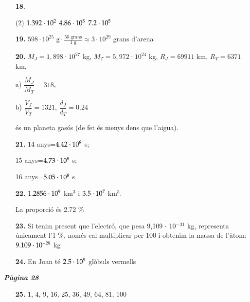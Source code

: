 \documentclass[a4paper, pdf, twoside]{book}
\begin{document}
\begin{multicols}{2}
\begin{enumerate}
 \item[\fontfamily{phv}\selectfont\color{blue}\textbf{18}. ] 
 \begin{tasks}[column-sep=1em, item-indent=1.3333em](2)
	 \task $1.392 \cdot 10^{2}$
	 \task $4.86 \cdot 10^{5}$
	 \task $7.2 \cdot 10^{5}$
\end{tasks}
\vspace{0.25cm}
\item[\fontfamily{phv}\selectfont\color{blue}\textbf{19. }]  \scalebox{0.6}{\simbolclau } 
$ 598 \cdot 10^{25} \text { g} \cdot \frac {50 \text { grans}}{1 \text { g}} \approx 3\cdot 10^{29}$ grans d'arena
\vspace{0.25cm}
\item[\fontfamily{phv}\selectfont\color{blue}\textbf{20. }] 
$M_J=1,898$·$10^{27}$ kg, $M_T=5,972$·$10^{24}$ kg, $R_J=69911$ km, $R_T=6371$ km, \par a) $\dfrac {M_J}{M_T} = 318$,\par b) $\dfrac {V_J}{V_T} = 1321$, $\dfrac {d_J}{d_T} = 0.24$\par és un planeta gasós (de fet és menys dens que l'aigua).
\vspace{0.25cm}
\item[\fontfamily{phv}\selectfont\color{blue}\textbf{21. }] 
14 anys=$4.42 \cdot 10^{8}$ s;\par 15 anys=$4.73 \cdot 10^{8}$ s;\par 16 anys=$5.05 \cdot 10^{8}$ s
\vspace{0.25cm}
\item[\fontfamily{phv}\selectfont\color{blue}\textbf{22. }] 
$1.2856 \cdot 10^{9}$ km${}^{3}$ i $3.5 \cdot 10^{7}$ km${}^{3}$.\par La proporció és 2.72 \%
\vspace{0.25cm}
\item[\fontfamily{phv}\selectfont\color{blue}\textbf{23. }] 
Si tenim present que l'electró, que pesa 9,109 $\cdot $ 10${}^{-}$${}^{31}$ kg, representa únicament l'1 \%, només cal multiplicar per 100 i obtenim la massa de l'àtom: $9.109 \cdot 10^{-29}$ kg
\vspace{0.25cm}
\item[\fontfamily{phv}\selectfont\color{blue}\textbf{24. }] 
En Joan té $2.5 \cdot 10^{9}$ glòbuls vermells
 \end{enumerate}
\vspace{0.3cm}


{\textbf{\em Pàgina 28}} \hrulefill
\begin{enumerate}
\vspace{0.25cm}
\item[\fontfamily{phv}\selectfont\color{blue}\textbf{25. }] 
1, 4, 9, 16, 25, 36, 49, 64, 81, 100
 \end{enumerate}
\begin{enumerate}
\vspace{0.25cm}



\end{enumerate}
\end{multicols}
\end{document}
